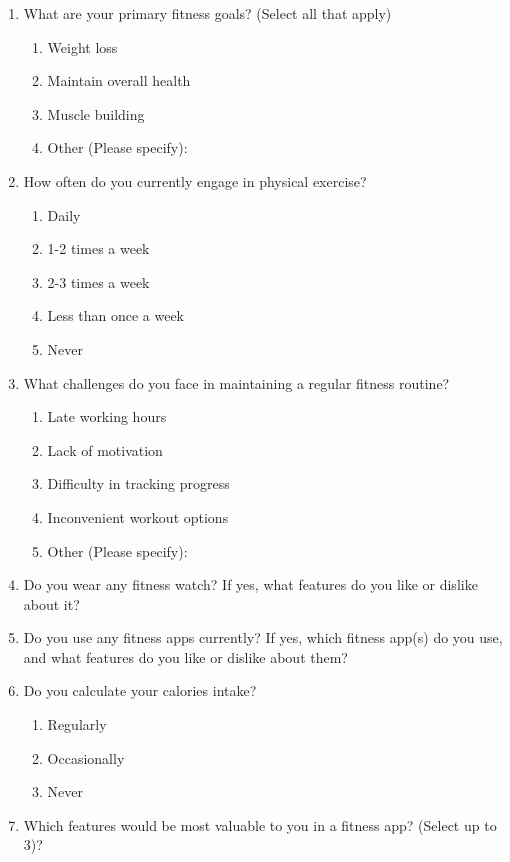 \documentclass[letterpaper,11pt]{texMemo} %
\begin{document}
\begin{enumerate}

\item What are your primary fitness goals? (Select all that apply)
 \begin{enumerate}
	\item Weight loss
	\item Maintain overall health
	\item Muscle building
	\item Other (Please specify): 
 \end{enumerate}
 
\item  How often do you currently engage in physical exercise?
 \begin{enumerate}
	\item Daily
	\item 1-2 times a week
	\item 2-3 times a week
	\item Less than once a week
	\item Never
\end{enumerate}

\item  What challenges do you face in maintaining a regular fitness routine?
\begin{enumerate}
	\item Late working hours
	\item Lack of motivation
	\item Difficulty in tracking progress
	\item Inconvenient workout options
	\item Other (Please specify): 
\end{enumerate}


\item  Do you wear any fitness watch? If yes, what features do you like or dislike about it?

\item Do you use any fitness apps currently? If yes, which fitness app(s) do you use, and what features do you like or dislike about them?

\item Do you calculate your calories intake?

\begin{enumerate}
	\item Regularly
	\item Occasionally
	\item Never
\end{enumerate}
\item Which features would be most valuable to you in a fitness app? (Select up to 3)?


\end{enumerate}
\end{document}
